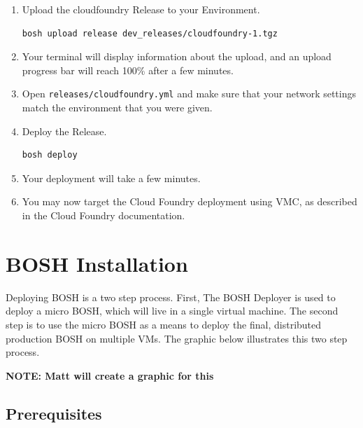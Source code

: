 \begin{enumerate}
\item Upload the cloudfoundry Release to your Environment.

\begin{verbatim}
bosh upload release dev_releases/cloudfoundry-1.tgz
\end{verbatim}


\item Your terminal will display information about the upload, and an upload progress bar will reach 100\% after a few minutes.

\item Open \texttt{releases\slash cloudfoundry.yml} and make sure that your network settings match the environment that you were given.

\item Deploy the Release.

\begin{verbatim}
bosh deploy
\end{verbatim}


\item Your deployment will take a few minutes.

\item You may now target the Cloud Foundry deployment using VMC, as described in the Cloud Foundry documentation.

\end{enumerate}

\chapter{BOSH Installation}
\label{boshinstallation}

Deploying BOSH is a two step process. First, The BOSH Deployer is used to deploy a micro BOSH, which will live in a single virtual machine. The second step is to use the micro BOSH as a means to deploy the final, distributed production BOSH on multiple VMs. The graphic below illustrates this two step process.

\textbf{NOTE: Matt will create a graphic for this}

\section{Prerequisites}
\label{prerequisites}

